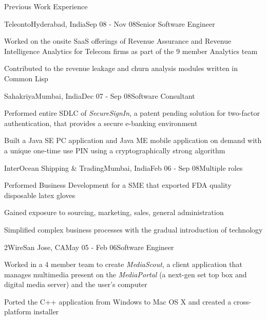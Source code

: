 \documentclass{resume} %
\begin{document}
\begin{rSection}{Previous Work Experience}

\begin{rSubsection}{Teleonto}{Hyderabad, India}{Sep 08 - Nov 08}{Senior Software Engineer}
\item Worked on the onsite SaaS offerings of Revenue Assurance and Revenue Intelligence Analytics for Telecom firms as part of the 9 member Analytics team
\item Contributed to the revenue leakage and churn analysis modules written in Common Lisp
\end{rSubsection}


\begin{rSubsection}{Sahakriya}{Mumbai, India}{Dec 07 - Sep 08}{Software Consultant}
\item Performed entire SDLC of {\em SecureSignIn}, a patent pending solution for two-factor authentication, that provides a secure e-banking environment
\item Built a Java SE PC application and Java ME mobile application on demand with a unique one-time use PIN using a cryptographically strong algorithm
\end{rSubsection}


\begin{rSubsection}{InterOcean Shipping \& Trading}{Mumbai, India}{Feb 06 - Sep 08}{Multiple roles}
\item Performed Business Development for a SME that exported FDA quality disposable latex gloves
\item Gained exposure to sourcing, marketing, sales, general administration
\item Simplified complex business processes with the gradual introduction of technology
\end{rSubsection}



\begin{rSubsection}{2Wire}{San Jose, CA}{May 05 - Feb 06}{Software Engineer}
\item Worked in a 4 member team to create {\em MediaScout}, a client
  application that manages multimedia present on the {\em MediaPortal}
  (a next-gen set top box and digital media server) and the user's computer
\item Ported the C++ application from Windows to Mac OS X and created a cross-platform installer
\end{rSubsection}

\end{rSection}
\end{document}
